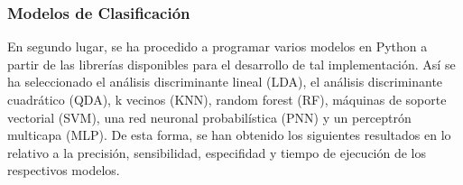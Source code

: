 \documentclass{article}
\begin{document}
\newpage
\subsubsection{Modelos de Clasificación}

En segundo lugar, se ha procedido a programar varios modelos en Python
a partir de las  librerías  disponibles  para  el  desarrollo  de  tal
implementación.  Así se  ha  seleccionado  el  análisis  discriminante
lineal (LDA), el análisis discriminante cuadrático  (QDA),  k  vecinos
(KNN), random forest (RF), máquinas de soporte	vectorial  (SVM),  una
red neuronal probabilística (PNN) y un perceptrón multicapa (MLP).  De
esta forma, se han obtenido los siguientes resultados en lo relativo a
la precisión, sensibilidad, especifidad y tiempo de ejecución  de  los
respectivos modelos.















\end{document}
